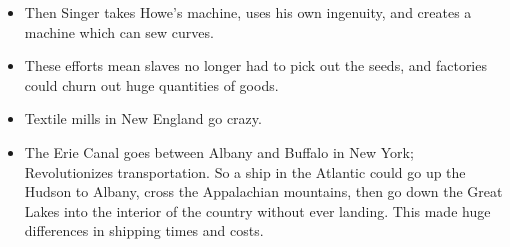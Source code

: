\documentclass{article}
\begin{document}
\begin{itemize}
    \item Then Singer takes Howe's machine, uses his own ingenuity, and creates a machine which can sew curves. 
    \item These efforts mean slaves no longer had to pick out the seeds, and factories could churn out huge quantities of goods.
    \item Textile mills in New England go crazy.
    \item The Erie Canal goes between Albany and Buffalo in New York; Revolutionizes transportation. So a ship in the Atlantic could go up the Hudson to Albany, cross the Appalachian mountains, then go down the Great Lakes into the interior of the country without ever landing. This made huge differences in shipping times and costs. 
  \end{itemize}
\end{document}
